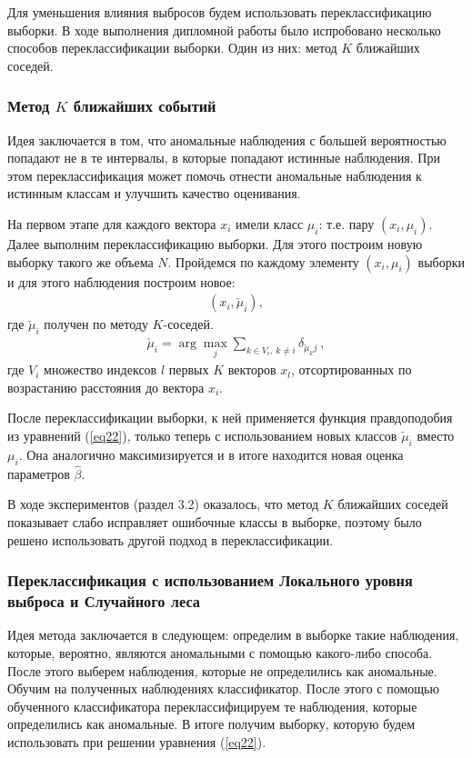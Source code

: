 Для уменьшения влияния выбросов будем использовать переклассификацию выборки.
В ходе выполнения дипломной работы было испробовано несколько способов переклассификации выборки. Один из них: метод $K$ ближайших соседей. 

\subsubsection{Метод $K$ ближайших событий}
Идея заключается в том, что аномальные наблюдения с большей вероятностью попадают не в те интервалы, в которые попадают истинные наблюдения. 
При этом переклассификация может помочь отнести аномальные наблюдения к истинным классам и улучшить качество оценивания.

На первом этапе для каждого вектора $x_i$ имели класс $\mu_i$: т.е. пару $(x_i,\mu_i)$.
Далее выполним переклассификацию выборки. 
Для этого построим новую выборку такого же объема $N$.
Пройдемся по каждому элементу $(x_i, \mu_i)$ выборки и для этого наблюдения построим новое:
\begin{eqnarray}
    (x_i, \check{\mu}_i),
\end{eqnarray}
где $\check{\mu}_i$ получен по методу $K$-соседей.\hfill\break
\begin{eqnarray}
    \check{\mu}_i = \arg\max_j \sum_{k \in V_i,~k\neq i} \delta_{\check{\mu}_k j}~,
\end{eqnarray}
где $V_i$ множество индексов $l$ первых $K$ векторов $x_l$, отсортированных по возрастанию расстояния до вектора $x_i$.

После переклассификации выборки, к ней применяется функция правдоподобия из уравнений (\ref{eq22}), только теперь с использованием новых классов $\check{\mu}_i$ вместо $\mu_i$. 
Она аналогично максимизируется и в итоге находится новая оценка параметров $\hat{\beta}$.

В ходе экспериментов (раздел 3.2) оказалось, что метод $K$ ближайших соседей показывает слабо исправляет ошибочные классы в выборке, поэтому было решено использовать другой подход в переклассификации.

\subsubsection{Переклассификация с использованием Локального уровня выброса и Случайного леса}
Идея метода заключается в следующем: определим в выборке такие наблюдения, которые, вероятно, являются аномальными с помощью какого-либо способа. После этого выберем наблюдения, которые не определились как аномальные.
Обучим на полученных наблюдениях классификатор. После этого с помощью обученного классификатора переклассифицируем те наблюдения, которые определились как аномальные. В итоге получим выборку, которую будем использовать при решении уравнения (\ref{eq22}).

